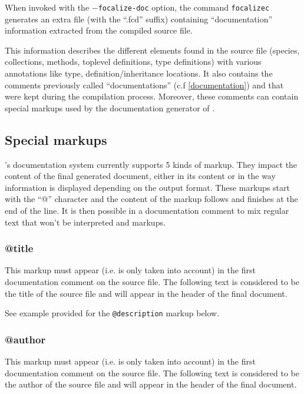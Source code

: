 

When invoked with the {\tt $-$focalize-doc} option, the command
{\tt focalizec} generates an extra file (with the ``.fcd'' suffix)
containing ``documentation'' information extracted from the compiled
source file.

This information describes the different elements found in the source
file (species, collections, methods, toplevel definitions, type
definitions) with various annotations like type,
definition/inheritance locations. It also contains the comments
previously called ``documentations'' (c.f \ref{documentation}) and that
were kept during the compilation process. Moreover, these comments can
contain special markups used by the documentation generator of \focal.



\subsection{Special markups}
\focal's documentation system currently supports 5 kinds of
markup. They impact the content of the final generated document,
either in its content or in the way information is displayed depending
on the output format. These markups start with the ``@'' character and
the content of the markup follows and finishes at the end of the
line. It is then possible in a documentation comment to mix regular
text that won't be interpreted and markups.

\subsubsection{@title}
This markup must appear (i.e. is only taken into account) in the first
documentation comment on the source file. The following text is
considered to be the title of the source file and will appear in the
header of the final document.

See example provided for the {\tt @description} markup below.



\subsubsection{@author}
This markup must appear (i.e. is only taken into account) in the first
documentation comment on the source file. The following text is
considered to be the author of the source file and will appear in the
header of the final document.

